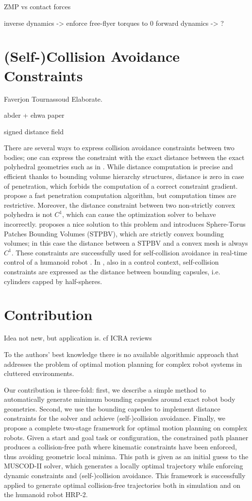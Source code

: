 ZMP vs contact forces

inverse dynamics -> enforce free-flyer torques to 0
forward dynamics -> ?

\section{(Self-)Collision Avoidance Constraints}

Faverjon Tournassoud
Elaborate.

abder + ehwa paper

signed distance field

There are several ways to express collision avoidance constraints
between two bodies; one can express the constraint with the exact
distance between the exact polyhedral geometries such as in
\cite{Larsen2000}. While distance computation is precise and efficient
thanks to bounding volume hierarchy structures, distance is zero in
case of penetration, which forbids the computation of a correct
constraint gradient. \cite{Kim2002} propose a fast penetration
computation algorithm, but computation times are
restrictive. Moreover, the distance constraint between two
non-strictly convex polyhedra is not $C^1$, which can cause the
optimization solver to behave incorrectly. \cite{Escande2007} proposes
a nice solution to this problem and introduces Sphere-Torus Patches
Bounding Volumes (STPBV), which are strictly convex bounding volumes;
in this case the distance between a STPBV and a convex mesh is always
$C^1$. These constraints are successfully used for self-collision
avoidance in real-time control of a humanoid robot
\cite{Stasse2008}. In \cite{Kanoun2011}, also in a control context,
self-collision constraints are expressed as the distance between
bounding capsules, i.e. cylinders capped by half-spheres.

\section{Contribution}
Idea not new, but application is. cf ICRA reviews

To the authors' best knowledge there is no available algorithmic
approach that addresses the problem of optimal motion planning for
complex robot systems in cluttered environments.

Our contribution is three-fold: first, we describe a simple method to
automatically generate minimum bounding capsules around exact robot
body geometries. Second, we use the bounding capsules to implement
distance constraints for the solver and achieve (self-)collision
avoidance. Finally, we propose a complete two-stage framework for
optimal motion planning on complex robots. Given a start and goal task
or configuration, the constrained path planner produces a
collision-free path where kinematic constraints have been enforced,
thus avoiding geometric local minima. This path is given as an initial
guess to the \textsc{MUSCOD-II} solver, which generates a locally
optimal trajectory while enforcing dynamic constraints and
(self-)collision avoidance. This framework is successfully applied to
generate optimal collision-free trajectories both in simulation and on
the humanoid robot HRP-2.

